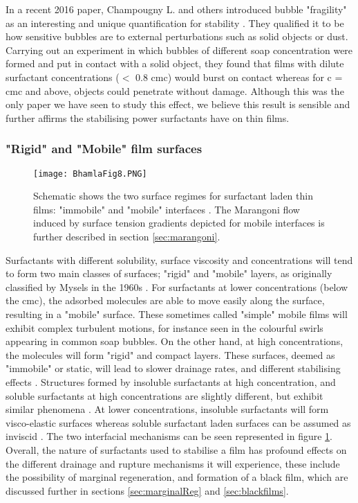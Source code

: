 \documentclass[a4paper,12pt]{article}
\numberwithin{equation}{section}
\numberwithin{figure}{section}
\numberwithin{table}{section}
\begin{document}
In a recent 2016 paper, Champougny L. and others introduced bubble "fragility" as an interesting and unique quantification for stability \cite{ChampougnyNotBare2016}. They qualified it to be how sensitive bubbles are to external perturbations such as solid objects or dust. Carrying out an experiment in which bubbles of different soap concentration were formed and put in contact with a solid object, they found that films with dilute surfactant concentrations ($<$ 0.8 cmc) would burst on contact whereas for c = cmc and above, objects could penetrate without damage. Although this was the only paper we have seen to study this effect, we believe this result is sensible and further affirms the stabilising power surfactants have on thin films.


\subsubsection{"Rigid" and "Mobile" film surfaces}
\label{sec:RigidMobile}

\begin{figure}[!htbp]
    \centering
    \captionsetup{width=.9\linewidth}
    \texttt{[image: BhamlaFig8.PNG]}
    \caption{Schematic shows the two surface regimes for surfactant laden thin films: "immobile" and "mobile" interfaces \cite{Bhamla2017}. The Marangoni flow induced by surface tension gradients depicted for mobile interfaces is further described in section \ref{sec:marangoni}.}
    \label{fig:Bhamla8}
\end{figure}

Surfactants with different solubility, surface viscosity and concentrations will tend to form two main classes of surfaces; "rigid" and "mobile" layers, as originally classified by Mysels in the 1960s \cite{Mysels1959Book}. For surfactants at lower concentrations (below the cmc), the adsorbed molecules are able to move easily along the surface, resulting in a "mobile" surface. These sometimes called "simple" mobile films \cite{Langevin1994} will exhibit complex turbulent motions, for instance seen in the colourful swirls appearing in common soap bubbles. On the other hand, at high concentrations, the molecules will form "rigid" and compact layers. These surfaces, deemed as "immobile" or static, will lead to slower drainage rates, and different stabilising effects \cite{Bhamla2017}. Structures formed by insoluble surfactants at high concentration, and soluble surfactants at high concentrations are slightly different, but exhibit similar phenomena \cite{Bhamla2017, ChampougnyNotBare2016}. At lower concentrations, insoluble surfactants will form visco-elastic surfaces whereas soluble surfactant laden surfaces can be assumed as inviscid \cite{Bhamla2017}. The two interfacial mechanisms can be seen represented in figure \ref{fig:Bhamla8}. Overall, the nature of surfactants used to stabilise a film has profound effects on the different drainage and rupture mechanisms it will experience, these include the possibility of marginal regeneration, and formation of a black film, which are discussed further in sections \ref{sec:marginalReg} and \ref{sec:blackfilms}.
\end{document}
